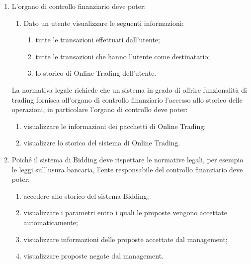 \begin{enumerate}
	\item L'organo di controllo finanziario deve poter:
	\begin{enumerate}
    	\item Dato un utente visualizzare le seguenti informazioni:
        	\begin{enumerate}
	            \item tutte le transazioni effettuati dall'utente;
    	        \item tutte le transazioni che hanno l'utente come destinatario;
	            \item lo storico di Online Trading dell'utente.
    	    \end{enumerate}
	\end{enumerate}
	La normativa legale richiede che un sistema in grado di offrire funzionalit\`a di trading fornisca all'organo di controllo finanziario l'accesso allo storico delle operazioni, in particolare l'organo di controllo deve poter:
	\begin{enumerate}
    	\item visualizzare le informazioni dei pacchetti di Online Trading;
    	\item visualizzre lo storico del sistema di Online Trading.
	\end{enumerate}

	\item Poich\'e il sistema di Bidding deve rispettare le normative legali, per esempio le leggi sull'usura bancaria, l'ente responsabile del controllo finanziario deve poter:
	\begin{enumerate}
    	\item accedere allo storico del sistema Bidding;
    	\item visualizzare i parametri entro i quali le proposte vengono accettate automaticamente;
    	\item visualizzare informazioni delle proposte accettate dal management;
    	\item visualizzare proposte negate dal management.
	\end{enumerate}

\end{enumerate}





